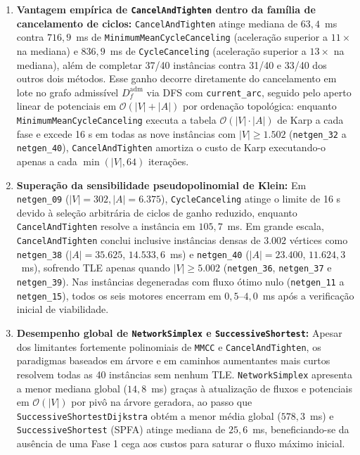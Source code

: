 \begin{enumerate}
    \item \textbf{Vantagem empírica de \lstinline{CancelAndTighten} dentro da família de cancelamento de ciclos:} \lstinline{CancelAndTighten} atinge mediana de $63{,}4$~ms contra $716{,}9$~ms de \lstinline{MinimumMeanCycleCanceling} (aceleração superior a $11\times$ na mediana) e $836{,}9$~ms de \lstinline{CycleCanceling} (aceleração superior a $13\times$ na mediana), além de completar 37/40 instâncias contra 31/40 e 33/40 dos outros dois métodos. Esse ganho decorre diretamente do cancelamento em lote no grafo admissível $D_f^{\text{adm}}$ via DFS com \lstinline{current_arc}, seguido pelo aperto linear de potenciais em $\mathcal{O}(|V| + |A|)$ por ordenação topológica: enquanto \lstinline{MinimumMeanCycleCanceling} executa a tabela $\mathcal{O}(|V| \cdot |A|)$ de Karp a cada fase e excede 16 s em todas as nove instâncias com $|V| \ge 1.502$ (\texttt{netgen\_32} a \texttt{netgen\_40}), \lstinline{CancelAndTighten} amortiza o custo de Karp executando-o apenas a cada $\min(|V|, 64)$ iterações.
    \item \textbf{Superação da sensibilidade pseudopolinomial de Klein:} Em \texttt{netgen\_09} ($|V|=302, |A|=6.375$), \lstinline{CycleCanceling} atinge o limite de 16 s devido à seleção arbitrária de ciclos de ganho reduzido, enquanto \lstinline{CancelAndTighten} resolve a instância em $105{,}7$~ms. Em grande escala, \lstinline{CancelAndTighten} conclui inclusive instâncias densas de $3.002$ vértices como \texttt{netgen\_38} ($|A|=35.625$, $14.533{,}6$~ms) e \texttt{netgen\_40} ($|A|=23.400$, $11.624{,}3$~ms), sofrendo TLE apenas quando $|V| \ge 5.002$ (\texttt{netgen\_36}, \texttt{netgen\_37} e \texttt{netgen\_39}). Nas instâncias degeneradas com fluxo ótimo nulo (\texttt{netgen\_11} a \texttt{netgen\_15}), todos os seis motores encerram em $0{,}5\text{--}4{,}0$~ms após a verificação inicial de viabilidade.
    \item \textbf{Desempenho global de \lstinline{NetworkSimplex} e \lstinline{SuccessiveShortest}:} Apesar dos limitantes fortemente polinomiais de \lstinline{MMCC} e \lstinline{CancelAndTighten}, os paradigmas baseados em árvore e em caminhos aumentantes mais curtos resolvem todas as 40 instâncias sem nenhum TLE. \lstinline{NetworkSimplex} apresenta a menor mediana global ($14{,}8$~ms) graças à atualização de fluxos e potenciais em $\mathcal{O}(|V|)$ por pivô na árvore geradora, ao passo que \lstinline{SuccessiveShortestDijkstra} obtém a menor média global ($578{,}3$~ms) e \lstinline{SuccessiveShortest} (SPFA) atinge mediana de $25{,}6$~ms, beneficiando-se da ausência de uma Fase 1 cega aos custos para saturar o fluxo máximo inicial.
\end{enumerate}


